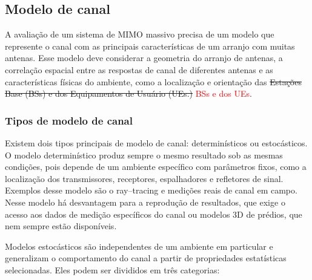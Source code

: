 \subsection{Modelo de canal}
\label{sec:modelo-canal}
A avaliação de um sistema de MIMO massivo precisa de um modelo que represente o canal com as principais características de um arranjo com muitas antenas. Esse modelo deve considerar a geometria do arranjo de antenas, a correlação espacial entre as respostas de canal de diferentes antenas e as características físicas do ambiente, como a localização e orientação das \sout{Estações Base (BSs) e dos Equipamentos de Usuário (UEs.)} \textcolor{red}{BSs e dos UEs}. 

\subsubsection{Tipos de modelo de canal}
Existem dois tipos principais de modelo de canal: determinísticos ou estocásticos. O modelo determinístico produz sempre o mesmo resultado sob as mesmas condições, pois depende de um ambiente específico com parâmetros fixos, como a localização dos transmissores, receptores, espalhadores e refletores de sinal. Exemplos desse modelo são o ray–tracing e medições reais de canal em campo. Nesse modelo há desvantagem para a reprodução de resultados, que exige o acesso aos dados de medição específicos do canal ou modelos 3D de prédios, que nem sempre estão disponíveis. 

Modelos estocásticos são independentes de um ambiente em particular e generalizam o comportamento do canal a partir de propriedades estatísticas selecionadas. Eles podem ser divididos em três categorias:

